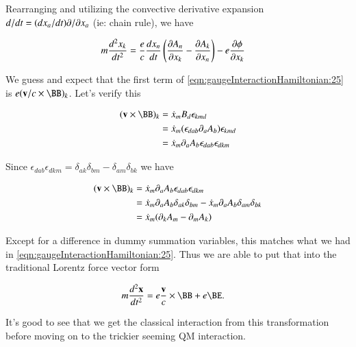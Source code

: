 Rearranging and utilizing the convective derivative expansion $d/dt = (d x_a/dt) \PDi{x_a}{}$ (ie: chain rule), we have

\begin{align}\label{eqn:gaugeInteractionHamiltonian:25}
m \frac{d^2 x_k}{dt^2} 
&=
\frac{e}{c} 
\frac{d x_n}{dt}
\left( 
\PD{x_k}{A_n}
- 
\PD{x_n}{A_k} 
\right)
 - e \PD{x_k}{\phi}
\end{align}

We guess and expect that the first term of \ref{eqn:gaugeInteractionHamiltonian:25} is $e (\Bv/c \cross \BB)_k$.  Let's verify this 

\begin{align*}
(\Bv \cross \BB)_k
&= \xdot_m B_d \epsilon_{k m d} \\
&= \xdot_m ( \epsilon_{d a b} \partial_a A_b ) \epsilon_{k m d} \\
&= \xdot_m \partial_a A_b \epsilon_{d a b} \epsilon_{d k m}
\end{align*}

Since $\epsilon_{d a b} \epsilon_{d k m} = \delta_{a k} \delta_{b m} - \delta_{a m} \delta_{b k}$ we have

\begin{align*}
(\Bv \cross \BB)_k
&= \xdot_m \partial_a A_b \epsilon_{d a b} \epsilon_{d k m} \\
&=
\xdot_m \partial_a A_b \delta_{a k} \delta_{b m} 
-\xdot_m \partial_a A_b \delta_{a m} \delta_{b k} \\
&= 
\xdot_m ( \partial_k A_m - \partial_m A_k )
\end{align*}

Except for a difference in dummy summation variables, this matches what we had in \ref{eqn:gaugeInteractionHamiltonian:25}.  Thus we are able to put that into the traditional Lorentz force vector form 

\begin{align}\label{eqn:gaugeInteractionHamiltonian:30}
m \frac{d^2 \Bx}{dt^2} &= e \frac{\Bv}{c} \cross \BB + e \BE.
\end{align}

It's good to see that we get the classical interaction from this transformation before moving on to the trickier seeming QM interaction.

\EndArticle

